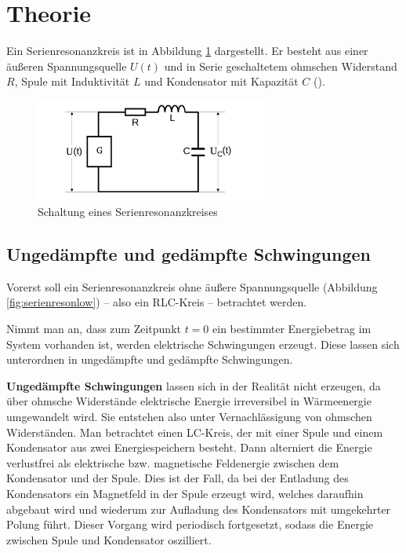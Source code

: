 \section{Theorie}
\label{sec:Theorie}


Ein Serienresonanzkreis ist in Abbildung \ref{fig:serienreson} dargestellt.
Er besteht aus einer äußeren Spannungsquelle $U(t)$ und in Serie 
geschaltetem ohmschen Widerstand $R$, Spule mit Induktivität $L$ und Kondensator 
mit Kapazität $C$ (\cite{noltingbro}).

\begin{figure}
	\centering
	\includegraphics[width=0.7\textwidth]{Bilder/Aufbau.png}
	\caption{Schaltung eines Serienresonanzkreises \cite{Anleitung}}
	\label{fig:serienreson}
\end{figure}


\subsection{Ungedämpfte und gedämpfte Schwingungen}

Vorerst soll ein Serienresonanzkreis ohne äußere Spannungsquelle (Abbildung \ref{fig:serienresonlow}) -- also ein RLC-Kreis -- betrachtet werden.

Nimmt man an, dass zum Zeitpunkt $t=0$ ein bestimmter Energiebetrag im System vorhanden ist, 
werden elektrische Schwingungen erzeugt.
Diese lassen sich unterordnen in ungedämpfte und gedämpfte Schwingungen.

\textbf{Ungedämpfte Schwingungen} lassen sich in der Realität nicht erzeugen, da über ohmsche 
Widerstände elektrische Energie irreversibel in Wärmeenergie umgewandelt wird.
Sie entstehen also unter Vernachlässigung von ohmschen Widerständen.
Man betrachtet einen LC-Kreis, der mit einer Spule und einem Kondensator aus zwei 
Energiespeichern besteht. 
Dann alterniert die Energie verlustfrei als elektrische bzw. magnetische Feldenergie zwischen dem Kondensator und der Spule. 
Dies ist der Fall, da bei der Entladung des Kondensators ein Magnetfeld in der Spule erzeugt 
wird, welches daraufhin abgebaut wird und wiederum zur Aufladung des Kondensators mit 
umgekehrter Polung führt. Dieser Vorgang wird periodisch fortgesetzt, sodass die Energie zwischen Spule und Kondensator oszilliert.

